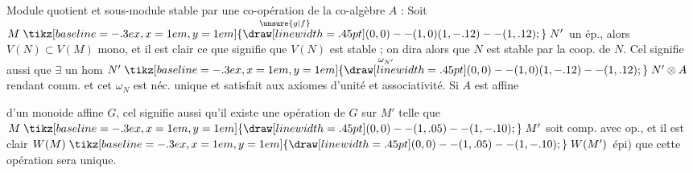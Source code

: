 Module quotient et sous-module stable par une co-opération de la co-algèbre $A$ : Soit $M\overset{\unsure{g|f}}{\mathrel{\tikz[baseline=-.3ex,x=1em,y=1em]{\draw[line width=.45pt] (0,0)--(1,0) (1,-.12)--(1,.12);}}}N'$ un ép., alors $V(N)\subset V(M)$ mono, et il est clair ce que signifie que $V(N)$ est stable ; on dira alors que $N$ est stable par la coop. de $N$. Cel signifie aussi que $\exists$ un hom $N'\overset{\omega_{N'}}{\mathrel{\tikz[baseline=-.3ex,x=1em,y=1em]{\draw[line width=.45pt] (0,0)--(1,0) (1,-.12)--(1,.12);}}}N'\otimes A$ rendant comm.
et cet $\omega_{N}$ est néc. unique et satisfait aux axiomes d'unité et associativité. Si $A$ est  affine

d'un monoide affine $G$, cel signifie aussi qu'il existe une opération de $G$ sur $M'$  telle que $M\mathrel{\tikz[baseline=-.3ex,x=1em,y=1em]{\draw[line width=.45pt] (0,0)--(1,.05)--(1,-.10);}}M'$ soit comp. avec  op., et il est clair  $W(M)\mathrel{\tikz[baseline=-.3ex,x=1em,y=1em]{\draw[line width=.45pt] (0,0)--(1,.05)--(1,-.10);}}W(M')$ épi) que cette opération sera unique.

